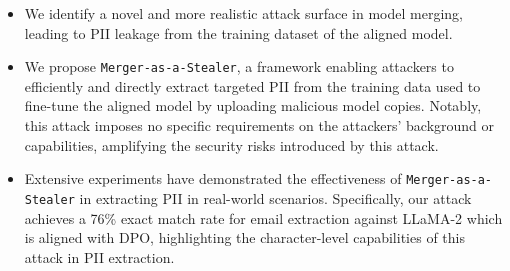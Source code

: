 \begin{itemize}[itemsep=3pt, leftmargin=*, topsep=5pt]

    \item We identify a novel and more realistic attack surface in model merging, leading to PII leakage from the training dataset of the aligned model.

    \item We propose \texttt{Merger-as-a-Stealer}, a framework enabling attackers to efficiently and directly extract targeted PII from the training data used to fine-tune the aligned model by uploading malicious model copies. Notably, this attack imposes no specific requirements on the attackers’ background or capabilities, amplifying the security risks introduced by this attack.

    \item Extensive experiments have demonstrated the effectiveness of \texttt{Merger-as-a-Stealer} in extracting PII in real-world scenarios. Specifically, our attack achieves a 76\% exact match rate for email extraction against LLaMA-2 which is aligned with DPO, highlighting the character-level capabilities of this attack in PII extraction.
    
\end{itemize}




